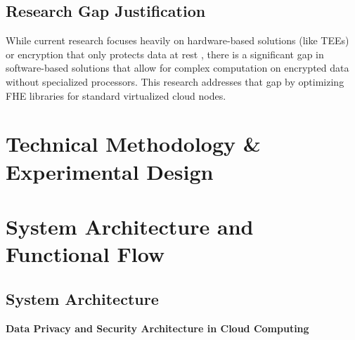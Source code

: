 \documentclass[12pt, a4paper]{article}
\begin{document}
\subsection{Research Gap Justification} 
While current research focuses heavily on hardware-based solutions (like TEEs) or encryption that only protects data at rest \cite{bhushan2022cloudsecurity}, there is a significant gap in software-based solutions that allow for complex computation on encrypted data without specialized processors. This research addresses that gap by optimizing FHE libraries for standard virtualized cloud nodes.

\section{Technical Methodology \& Experimental Design} 

\section{System Architecture and Functional Flow}

\subsection{System Architecture}  

\begin{center}
\textbf{\LARGE Data Privacy and Security Architecture in Cloud Computing}
\end{center}
\end{document}
